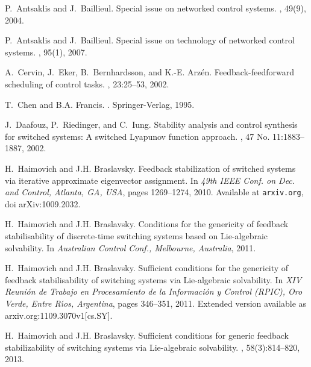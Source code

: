 \documentclass[letterpaper, 10 pt, conference]{ieeeconf}
\begin{document}
 
\begin{thebibliography}{10}

P.~Antsaklis and J.~Baillieul.
 {S}pecial issue on networked control systems.
, 49(9), 2004.

P.~Antsaklis and J.~Baillieul.
 {S}pecial issue on technology of networked control
  systems.
, 95(1), 2007.

A.~Cervin, J.~Eker, B.~Bernhardsson, and K.-E. Arz\'en.
\newblock Feedback-feedforward scheduling of control tasks.
, 23:25--53, 2002.

T.~Chen and B.A. Francis.
.
\newblock Springer-Verlag, 1995.

J.~Daafouz, P.~Riedinger, and C.~Iung.
\newblock Stability analysis and control synthesis for switched systems: A
  switched {Lyapunov} function approach.
, 47 No. 11:1883--1887, 2002.

H.~Haimovich and J.H. Braslavsky.
\newblock Feedback stabilization of switched systems via iterative approximate
  eigenvector assignment.
\newblock In {\em 49th IEEE Conf. on Dec. and Control, Atlanta, GA, USA}, pages
  1269--1274, 2010.
\newblock Available at \texttt{arxiv.org}, doi arXiv:1009.2032.

H.~Haimovich and J.H. Braslavsky.
\newblock Conditions for the genericity of feedback stabilisability of
  discrete-time switching systems based on {L}ie-algebraic solvability.
\newblock In {\em Australian Control Conf., Melbourne, Australia}, 2011.

H.~Haimovich and J.H. Braslavsky.
\newblock Sufficient conditions for the genericity of feedback stabilisability
  of switching systems via {Lie}-algebraic solvability.
\newblock In {\em XIV Reuni\'on de Trabajo en Procesamiento de la Informaci\'on
  y Control (RPIC), Oro Verde, Entre R\'{\i}os, Argentina}, pages 346--351,
  2011.
\newblock Extended version available as arxiv.org:1109.3070v1{[cs.SY]}.

H.~Haimovich and J.H. Braslavsky.
\newblock Sufficient conditions for generic feedback stabilizability of
  switching systems via {L}ie-algebraic solvability.
, 58(3):814--820, 2013.


\end{thebibliography}
\end{document}

